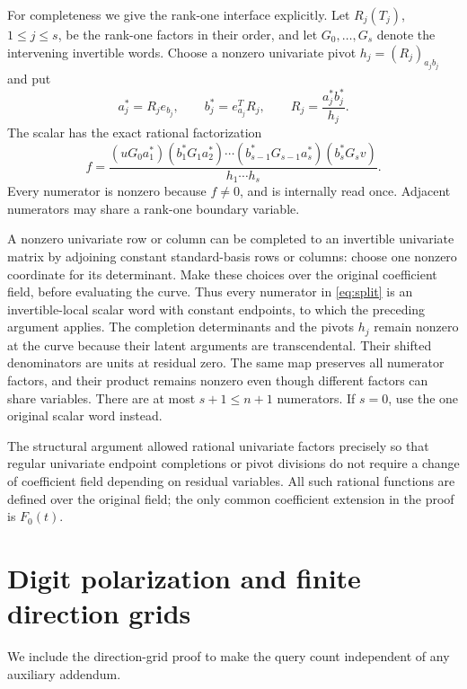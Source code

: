 \documentclass[11pt]{article}
\begin{document}
For completeness we give the rank-one interface explicitly. Let
$R_j(T_j)$, $1\le j\le s$, be the rank-one factors in their order,
and let $G_0,\ldots,G_s$ denote the intervening invertible words.
Choose a nonzero univariate pivot $h_j=(R_j)_{a_jb_j}$ and put
\[
 a_j^*=R_je_{b_j},\qquad b_j^*=e_{a_j}^{T}R_j,
 \qquad R_j=\frac{a_j^*b_j^*}{h_j}.
\]
The scalar has the exact rational factorization
\begin{equation}\label{eq:split}
 f=\frac{(uG_0a_1^*)
       (b_1^*G_1a_2^*)\cdots
       (b_{s-1}^*G_{s-1}a_s^*)(b_s^*G_sv)}
          {h_1\cdots h_s}.
\end{equation}
Every numerator is nonzero because $f\ne0$, and is internally read
once. Adjacent numerators may share a rank-one boundary variable.

A nonzero univariate row or column can be completed to an invertible
univariate matrix by adjoining constant standard-basis rows or columns:
choose one nonzero coordinate for its determinant. Make these choices
over the original coefficient field, before evaluating the curve.
Thus every numerator in \eqref{eq:split} is an invertible-local scalar
word with constant endpoints, to which the preceding argument applies.
The completion determinants and the pivots $h_j$ remain nonzero at
the curve because their latent arguments are transcendental. Their
shifted denominators are units at residual zero. The same map preserves
all numerator factors, and their product remains nonzero even though
different factors can share variables. There are at most $s+1\le n+1$
numerators. If $s=0$, use the one original scalar word instead.

The structural argument allowed rational univariate factors precisely
so that regular univariate endpoint completions or pivot divisions do
not require a change of coefficient field depending on residual
variables. All such rational functions are defined over the original
field; the only common coefficient extension in the proof is $F_0(t)$.

\section{Digit polarization and finite direction grids}

We include the direction-grid proof to make the query count independent
of any auxiliary addendum.
\end{document}
